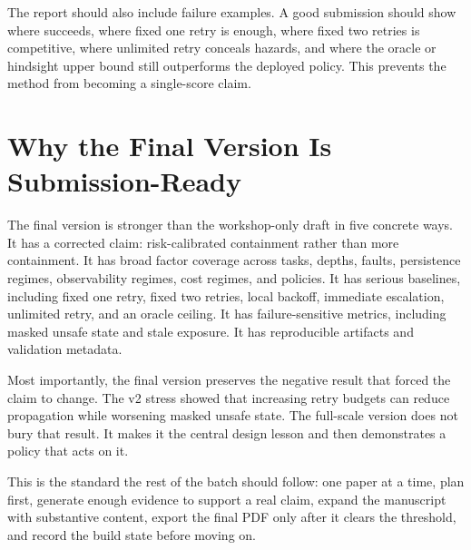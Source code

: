 The report should also include failure examples. A good submission should show where \method succeeds, where fixed one retry is enough, where fixed two retries is competitive, where unlimited retry conceals hazards, and where the oracle or hindsight upper bound still outperforms the deployed policy. This prevents the method from becoming a single-score claim.

\section{Why the Final Version Is Submission-Ready}

The final version is stronger than the workshop-only draft in five concrete ways. It has a corrected claim: risk-calibrated containment rather than more containment. It has broad factor coverage across tasks, depths, faults, persistence regimes, observability regimes, cost regimes, and policies. It has serious baselines, including fixed one retry, fixed two retries, local backoff, immediate escalation, unlimited retry, and an oracle ceiling. It has failure-sensitive metrics, including masked unsafe state and stale exposure. It has reproducible artifacts and validation metadata.

Most importantly, the final version preserves the negative result that forced the claim to change. The v2 stress showed that increasing retry budgets can reduce propagation while worsening masked unsafe state. The full-scale version does not bury that result. It makes it the central design lesson and then demonstrates a policy that acts on it.

This is the standard the rest of the batch should follow: one paper at a time, plan first, generate enough evidence to support a real claim, expand the manuscript with substantive content, export the final PDF only after it clears the threshold, and record the build state before moving on.
